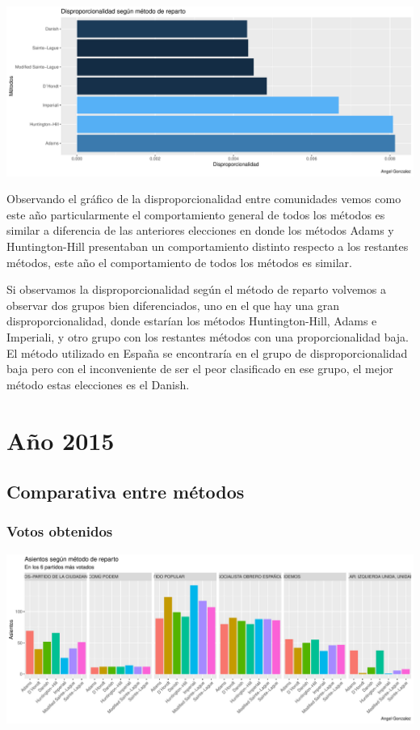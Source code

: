 \documentclass[12pt,a4paper,]{book}
\numberwithin{dummy}{section}
\theoremstyle{ocrenumbox}
\theoremstyle{blacknumex}
\theoremstyle{blacknumbox}
\theoremstyle{ocrenum}
\theoremstyle{ocrenum}
\begin{document}
\begin{center}\includegraphics[width=0.95\linewidth]{figurasR/unnamed-chunk-150-2} \end{center}

Observando el gráfico de la disproporcionalidad entre comunidades vemos
como este año particularmente el comportamiento general de todos los
métodos es similar a diferencia de las anteriores elecciones en donde
los métodos Adams y Huntington-Hill presentaban un comportamiento
distinto respecto a los restantes métodos, este año el comportamiento de
todos los métodos es similar.

Si observamos la disproporcionalidad según el método de reparto volvemos
a observar dos grupos bien diferenciados, uno en el que hay una gran
disproporcionalidad, donde estarían los métodos Huntington-Hill, Adams e
Imperiali, y otro grupo con los restantes métodos con una
proporcionalidad baja. El método utilizado en España se encontraría en
el grupo de disproporcionalidad baja pero con el inconveniente de ser el
peor clasificado en ese grupo, el mejor método estas elecciones es el
Danish.

\hypertarget{auxf1o-2015}{%
\section{Año 2015}\label{auxf1o-2015}}

\hypertarget{comparativa-entre-muxe9todos-11}{%
\subsection{Comparativa entre
métodos}\label{comparativa-entre-muxe9todos-11}}

\hypertarget{votos-obtenidos-11}{%
\subsubsection{Votos obtenidos}\label{votos-obtenidos-11}}

\begin{center}\includegraphics[width=0.95\linewidth]{figurasR/unnamed-chunk-158-1} \end{center}
\end{document}
